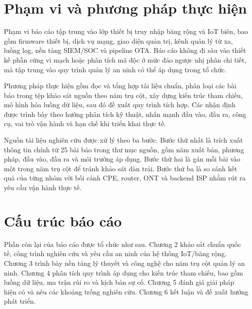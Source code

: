 \documentclass[../DoAn.tex]{subfiles}
\begin{document}
\section{Phạm vi và phương pháp thực hiện}
Phạm vi báo cáo tập trung vào lớp thiết bị truy nhập băng rộng và IoT biên, bao gồm firmware thiết bị, dịch vụ mạng, giao diện quản trị, kênh quản lý từ xa, luồng log, nền tảng SIEM/SOC và pipeline OTA. Báo cáo không đi sâu vào thiết kế phần cứng vi mạch hoặc phân tích mã độc ở mức đảo ngược nhị phân chi tiết, mà tập trung vào quy trình quản lý an ninh có thể áp dụng trong tổ chức.

Phương pháp thực hiện gồm đọc và tổng hợp tài liệu chuẩn, phân loại các bài báo trong tệp khảo sát nguồn theo năm trụ cột, xây dựng kiến trúc tham chiếu, mô hình hóa luồng dữ liệu, sau đó đề xuất quy trình tích hợp. Các nhận định được trình bày theo hướng phân tích kỹ thuật, nhấn mạnh đầu vào, đầu ra, công cụ, vai trò vận hành và hạn chế khi triển khai thực tế.

Nguồn tài liệu nghiên cứu được xử lý theo ba bước. Bước thứ nhất là trích xuất thông tin chính từ 25 bài báo trong thư mục nguồn, gồm năm xuất bản, phương pháp, đầu vào, đầu ra và môi trường áp dụng. Bước thứ hai là gán mỗi bài vào một trong năm trụ cột để tránh khảo sát dàn trải. Bước thứ ba là so sánh kết quả của từng nhóm với bối cảnh CPE, router, ONT và backend ISP nhằm rút ra yêu cầu vận hành thực tế.

\section{Cấu trúc báo cáo}
Phần còn lại của báo cáo được tổ chức như sau. Chương 2 khảo sát chuẩn quốc tế, công trình nghiên cứu và yêu cầu an ninh của hệ thống IoT/băng rộng. Chương 3 trình bày nền tảng lý thuyết và công nghệ cho năm trụ cột quản lý an ninh. Chương 4 phân tích quy trình áp dụng cho kiến trúc tham chiếu, bao gồm luồng dữ liệu, ma trận rủi ro và kịch bản sự cố. Chương 5 đánh giá giải pháp hiện có và nêu các khoảng trống nghiên cứu. Chương 6 kết luận và đề xuất hướng phát triển.
\end{document}
